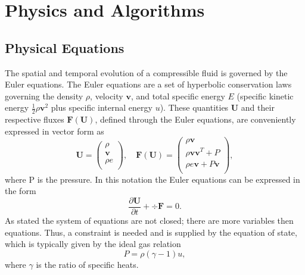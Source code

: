 \section{Physics and Algorithms}
\subsection{Physical Equations}
\label{sec.physical.eq}
The spatial and temporal evolution of a compressible fluid is governed by the
Euler equations. The Euler equations are a set of hyperbolic conservation laws
governing the density $\rho$, velocity $\mathbf{v}$, and total specific energy
$E$ (specific kinetic energy $\frac{1}{2}\rho \mathbf{v}^2$ plus specific internal
energy $u$). These quantities $\mathbf{U}$ and their respective fluxes
$\mathbf{F}(\mathbf{U})$, defined through the Euler equations, are conveniently
expressed in vector form as
%
\begin{equation}
    \mathbf{U} =
    \left(
    \begin{array}{c}
        \rho \\
        \mathbf{v} \\
        \rho e \\
    \end{array} \right),
    \quad
    \mathbf{F}(\mathbf{U}) =
    \left(
    \begin{array}{c}
        \rho\mathbf{v} \\
        \rho\mathbf{v}\mathbf{v}^T + P \\
        \rho e\mathbf{v} + P\mathbf{v} \\
    \end{array}
    \right),
\end{equation}
%
where P is the pressure. In this notation the Euler equations can be expressed
in the form
%
\begin{equation}
    \label{eq.euler}
    \frac{\partial \mathbf{U}}{\partial t} + \div \mathbf{F} = 0.
\end{equation}
%
As stated the system of equations are not closed; there are more variables then
equations. Thus, a constraint is needed and is supplied by the equation of state, which is typically given by the ideal gas relation
%
\begin{equation}
    P = \rho(\gamma - 1)u,
\end{equation}
%
where $\gamma$ is the ratio of specific heats.

